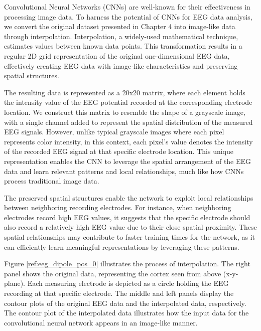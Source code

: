 \documentclass[a4paper, UKenglish, 11pt]{uiomaster}
\begin{document}
Convolutional Neural Networks (CNNs) are well-known for their effectiveness in processing image data. To harness the potential of CNNs for EEG data analysis, we convert the original dataset presented in Chapter 4 into image-like data through interpolation. Interpolation, a widely-used mathematical technique, estimates values between known data points. This transformation results in a regular 2D grid representation of the original one-dimensional EEG data, effectively creating EEG data with image-like characteristics and preserving spatial structures.

The resulting data is represented as a 20x20 matrix, where each element holds the intensity value of the EEG potential recorded at the corresponding electrode location. We construct this matrix to resemble the shape of a grayscale image, with a single channel added to represent the spatial distribution of the measured EEG signals. However, unlike typical grayscale images where each pixel represents color intensity, in this context, each pixel's value denotes the intensity of the recorded EEG signal at that specific electrode location. This unique representation enables the CNN to leverage the spatial arrangement of the EEG data and learn relevant patterns and local relationships, much like how CNNs process traditional image data.

The preserved spatial structures enable the network to exploit local relationships between neighboring recording electrodes. For instance, when neighboring electrodes record high EEG values, it suggests that the specific electrode should also record a relatively high EEG value due to their close spatial proximity. These spatial relationships may contribute to faster training times for the network, as it can efficiently learn meaningful representations by leveraging these patterns.

Figure \ref{ref:eeg_dipole_pos_0} illustrates the process of interpolation. The right panel shows the original data, representing the cortex seen from above (x-y-plane). Each measuring electrode is depicted as a circle holding the EEG recording at that specific electrode. The middle and left panels display the contour plots of the original EEG data and the interpolated data, respectively. The contour plot of the interpolated data illustrates how the input data for the convolutional neural network appears in an image-like manner.
\end{document}
